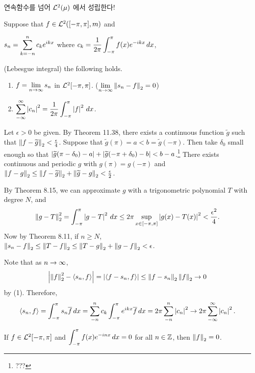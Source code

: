 연속함수를 넘어 \(\mathcal{L}^{2}(\mu)\) 에서 성립한다!

  Suppose that \(f \in \mathcal{L}^{2}([-\pi, \pi], m)\) and
\begin{center}
    \(s_n = \displaystyle \sum_{k = -n}^{n} c_k e^{ikx}\) \quad where \quad \(\displaystyle c_k = \frac{1}{2\pi} \int_{-\pi}^{\pi} f(x)e^{-ikx} \,d{x}\),
\end{center}
(Lebesgue integral) the following holds.
\begin{enumerate}
    \item \(f = \displaystyle \lim_{n \rightarrow \infty} s_n\) in \(\mathcal{L}^{2}[-\pi, \pi]\). (\(\displaystyle \lim_{n \rightarrow \infty} \left\lVert s_n -f \right\rVert_2 = 0\))
    \item \(\displaystyle \sum_{-\infty}^{\infty} \left| c_n \right|^2 = \frac{1}{2\pi} \int_{-\pi}^{\pi} \left| f \right|^2 \,d{x}\).
\end{enumerate}

\pf {} Let \(\epsilon > 0\) be given. By {\sffamily Theorem 11.38}, there exists a continuous function \(\widetilde{g}\) such that \(\left\lVert f - \widetilde{g} \right\rVert_2 < \frac{\epsilon}{4}\). Suppose that \(\widetilde{g}(\pi) = a < b = \widetilde{g}(-\pi)\). Then take \(\delta_0\) small enough so that \(\left| \widetilde{g}(\pi - \delta_0)- a \right| + \left| \widetilde{g}(-\pi + \delta_0) - b \right| < b-a\).\footnote{???} There exists continuous and periodic \(g\) with \(g(\pi) = g(-\pi)\) and \(\left\lVert f - g \right\rVert_2 \leq \left\lVert f - \widetilde{g} \right\rVert_2 + \left\lVert \widetilde{g} - g \right\rVert_2 < \frac{\epsilon}{2}\).

By {\sffamily Theorem 8.15}, we can approximate \(g\) with a trigonometric polynomial \(T\) with degree \(N\), and
\[
    \left\lVert g - T \right\rVert_2^2 = \int_{-\pi}^{\pi} \left| g - T \right|^2 \,d{x} \leq 2\pi \sup_{x \in [-\pi, \pi]} \left| g(x) - T(x) \right|^2 < \frac{\epsilon^2}{4}.
\]
Now by {\sffamily Theorem 8.11}, if \(n \geq N\), \(\left\lVert s_n - f \right\rVert_2 \leq \left\lVert T - f \right\rVert_2 \leq \left\lVert T-g \right\rVert_2 + \left\lVert g - f \right\rVert_2 < \epsilon\).

 Note that as \(n \rightarrow \infty\),
\[
    \left| \left\lVert f \right\rVert_2^2 - \left\langle s_n, f \right\rangle \right| = \left| \left\langle f - s_n, f \right\rangle \right| \leq \left\lVert f - s_n \right\rVert_2 \left\lVert f \right\rVert_2 \rightarrow 0
\]
by (1). Therefore,
\[
    \left\langle s_n, f \right\rangle = \int_{-\pi}^{\pi} s_n \overline{f} \,d{x} = \sum_{-n}^{n} c_k \int_{-\pi}^{\pi} e^{ikx}\overline{f} \,d{x} = 2 \pi \sum_{-n}^{n} \left| c_n \right|^2 \rightarrow 2\pi \sum_{-\infty}^{\infty} \left| c_n \right|^2.
\]

\cor If \(f \in \mathcal{L}^{2}[-\pi, \pi]\) and \(\displaystyle \int_{-\pi}^{\pi} f(x) e^{-inx}\,d{x} = 0\)
for all \(n \in \mathbb{Z}\), then \(\left\lVert f \right\rVert_2 = 0\).

